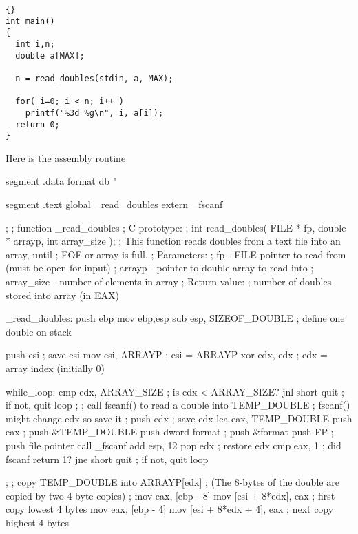 {\begin{lstlisting}{}
int main()
{
  int i,n;
  double a[MAX];

  n = read_doubles(stdin, a, MAX);

  for( i=0; i < n; i++ )
    printf("%3d %g\n", i, a[i]);
  return 0;
}
\end{lstlisting}

Here is the assembly routine
\begin{AsmCodeListing}[label=read.asm]
segment .data
format  db      "%

segment .text
        global  _read_doubles
        extern  _fscanf


;
; function _read_doubles
; C prototype:
;   int read_doubles( FILE * fp, double * arrayp, int array_size );
; This function reads doubles from a text file into an array, until
; EOF or array is full.
; Parameters:
;   fp         - FILE pointer to read from (must be open for input)
;   arrayp     - pointer to double array to read into
;   array_size - number of elements in array
; Return value:
;   number of doubles stored into array (in EAX)

_read_doubles:
        push    ebp
        mov     ebp,esp
        sub     esp, SIZEOF_DOUBLE      ; define one double on stack

        push    esi                     ; save esi
        mov     esi, ARRAYP             ; esi = ARRAYP
        xor     edx, edx                ; edx = array index (initially 0)

while_loop:
        cmp     edx, ARRAY_SIZE         ; is edx < ARRAY_SIZE?
        jnl     short quit              ; if not, quit loop
;
; call fscanf() to read a double into TEMP_DOUBLE
; fscanf() might change edx so save it
;
        push    edx                     ; save edx
        lea     eax, TEMP_DOUBLE
        push    eax                     ; push &TEMP_DOUBLE
        push    dword format            ; push &format
        push    FP                      ; push file pointer
        call    _fscanf
        add     esp, 12
        pop     edx                     ; restore edx
        cmp     eax, 1                  ; did fscanf return 1?
        jne     short quit              ; if not, quit loop

;
; copy TEMP_DOUBLE into ARRAYP[edx]
; (The 8-bytes of the double are copied by two 4-byte copies)
;
        mov     eax, [ebp - 8]
        mov     [esi + 8*edx], eax      ; first copy lowest 4 bytes
        mov     eax, [ebp - 4]
        mov     [esi + 8*edx + 4], eax  ; next copy highest 4 bytes


\end{AsmCodeListing}}
